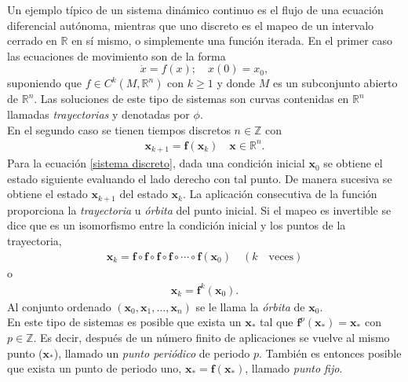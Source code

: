 Un ejemplo típico de un sistema dinámico continuo es el flujo de una ecuación diferencial autónoma, mientras que uno discreto es el mapeo de un intervalo cerrado en $\mathbb{R}$ en sí mismo, o simplemente una función iterada. En el primer caso las ecuaciones de movimiento son de la forma
\begin{equation}
\dot{x} =  f(x); \quad  
x(0)=x_{0} , \label{ec dif}
\end{equation}
suponiendo que $f \in C^{k}(M,\mathbb{R}^{n})$ con $k \geq 1$ y donde $M$ es un subconjunto abierto de $\mathbb{R}^{n}$. Las soluciones de este tipo de sistemas son curvas contenidas en $\mathbb{R}^{n}$ llamadas \textit{trayectorias} y denotadas por $\phi$.\\
En el segundo caso se tienen tiempos discretos $n\in \mathbb{Z}$ con 
\begin{eqnarray}
\pmb x_{k+1}= \mathbf{f}(\pmb x_{k}) \quad \pmb x\in \mathbb{R}^{n}. \label{sistema discreto}
\end{eqnarray}
Para la ecuación \eqref{sistema discreto}, dada una condición inicial $\pmb x_{0}$ se obtiene el estado siguiente evaluando el lado derecho con tal punto. De manera sucesiva se obtiene el estado $\pmb x_{k+1}$ del estado $\pmb x_{k}$. La aplicación consecutiva de la función proporciona la \textit{trayectoria} u \textit{órbita} del punto inicial. Si el mapeo es invertible se dice que es un isomorfismo entre la condición inicial y los puntos de la trayectoria,
\begin{eqnarray*}
\pmb x_{k}=\mathbf{f}\circ\mathbf{f}\circ \mathbf{f} \circ \mathbf{f} \circ  \cdots \circ \mathbf{f} (\pmb x_{0})\quad (k \quad \textrm{veces})
\end{eqnarray*}
o
\begin{eqnarray*}
\pmb x_{k} = \mathbf{f}^{k}(\pmb x_{0}).
\end{eqnarray*}
Al conjunto ordenado $( \pmb x_{0},\pmb x_{1},\ldots,\pmb x_{n} )$ se le llama la \textit{órbita} de $\pmb x_{0}$.\\

En este tipo de sistemas es posible que exista un $\pmb x_{*}$ tal que $\mathbf{f}^{p}(\pmb x_{*})=\pmb x_{*}$ con $p \in \mathbb{Z}$. Es decir, después de un número finito de aplicaciones se vuelve al mismo punto ($\pmb x_{*}$), llamado un \textit{punto periódico} de periodo $p$. También es entonces posible  que exista un punto de periodo uno, $\pmb x_{*}=\mathbf{f}(\pmb x_{*})$, llamado \textit{punto fijo}. \\

